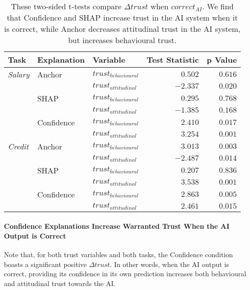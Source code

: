 \begin{table}[htb]
    \centering
    \caption{These two-sided t-tests compare $\Delta trust$ when $correct_{AI}$. We find that Confidence and SHAP increase trust in the AI system when it is correct, while Anchor decreases attitudinal trust in the AI system, but increases behavioural trust.}
    \label{tab:delta-trust-t-positives}
    \begin{tabular}{lllrr}
        \toprule
        Task & Explanation & Variable & Test Statistic & p Value \\ 
        \midrule
        \emph{Salary} & Anchor & $trust_{behavioural}$ & $0.502$ & $0.616$ \\
        & & $trust_{attitudinal}$ & $\mathbf{-2.337}$ & $\mathbf{0.020}$ \\
        & SHAP & $trust_{behavioural}$ & $0.295$ & $0.768$ \\
        & & $trust_{attitudinal}$ & $-1.385$ & $0.168$ \\
        & Confidence & $trust_{behavioural}$ & $\mathbf{2.410}$ & $\mathbf{0.017}$ \\
        & & $trust_{attitudinal}$ & $\mathbf{3.254}$ & $\mathbf{0.001}$ \\
        \midrule
        \emph{Credit} & Anchor & $trust_{behavioural}$ & $\mathbf{3.013}$ & $\mathbf{0.003}$ \\
        & & $trust_{attitudinal}$ & $\mathbf{-2.487}$ & $\mathbf{0.014}$ \\
        & SHAP & $trust_{behavioural}$ & $0.207$ & $0.836$ \\
        & & $trust_{attitudinal}$ & $\mathbf{3.538}$ & $\mathbf{0.001}$ \\
        & Confidence & $trust_{behavioural}$ & $\mathbf{2.863}$ & $\mathbf{0.005}$ \\
        & & $trust_{attitudinal}$ & $\mathbf{2.461}$ & $\mathbf{0.015}$ \\
        \bottomrule
    \end{tabular}
\end{table}

\paragraph{Confidence Explanations Increase Warranted Trust When the AI Output is Correct}
Note that, for both trust variables and both tasks, the Confidence condition boasts a significant positive $\Delta trust$. In other words, when the AI output is correct, providing its confidence in its own prediction increases both behavioural and attitudinal trust towards the AI.

